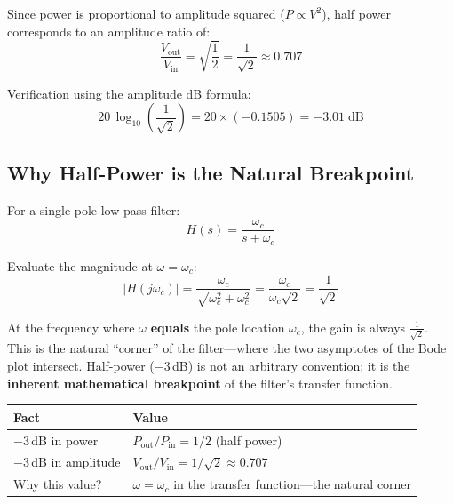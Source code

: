 \documentclass[12pt,a4paper]{article}
\begin{document}
Since power is proportional to amplitude squared ($P \propto V^2$), half power corresponds to an amplitude ratio of:
\begin{equation}
    \frac{V_{\text{out}}}{V_{\text{in}}} = \sqrt{\frac{1}{2}} = \frac{1}{\sqrt{2}} \approx 0.707
\end{equation}

Verification using the amplitude dB formula:
\begin{equation}
    20\,\log_{10}\!\left(\frac{1}{\sqrt{2}}\right) = 20 \times (-0.1505) = -3.01\;\text{dB}
\end{equation}

\subsection{Why Half-Power is the Natural Breakpoint}

For a single-pole low-pass filter:
\begin{equation}
    H(s) = \frac{\omega_c}{s + \omega_c}
\end{equation}

Evaluate the magnitude at $\omega = \omega_c$:
\begin{equation}
    |H(j\omega_c)| = \frac{\omega_c}{\sqrt{\omega_c^2 + \omega_c^2}}
                    = \frac{\omega_c}{\omega_c\sqrt{2}}
                    = \frac{1}{\sqrt{2}}
\end{equation}

At the frequency where $\omega$ \textbf{equals} the pole location $\omega_c$, the gain is always $\frac{1}{\sqrt{2}}$. This is the natural ``corner'' of the filter---where the two asymptotes of the Bode plot intersect. Half-power ($-3$\,dB) is not an arbitrary convention; it is the \textbf{inherent mathematical breakpoint} of the filter's transfer function.

\begin{keybox}
\centering
\begin{tabular}{ll}
    \toprule
    \textbf{Fact} & \textbf{Value} \\
    \midrule
    $-3$\,dB in power & $P_{\text{out}}/P_{\text{in}} = 1/2$ (half power) \\
    $-3$\,dB in amplitude & $V_{\text{out}}/V_{\text{in}} = 1/\sqrt{2} \approx 0.707$ \\
    Why this value? & $\omega = \omega_c$ in the transfer function---the natural corner \\
    \bottomrule
\end{tabular}
\end{keybox}
\end{document}
